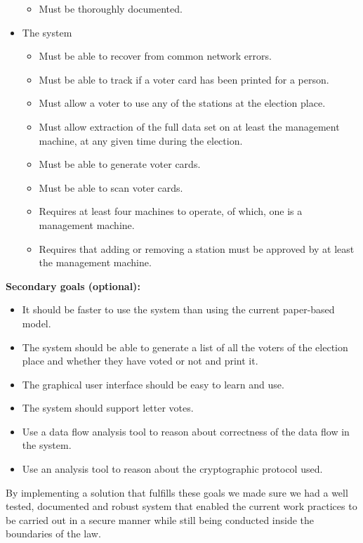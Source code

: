 \documentclass[a4paper]{report}
\begin{document}
\begin{itemize}
\begin{itemize}
\item Must be thoroughly documented.
\end{itemize}
\item The system
\begin{itemize}
\item Must be able to recover from common network errors.
\item Must be able to track if a voter card has been printed for a person.
\item Must allow a voter to use any of the stations at the election place.
\item Must allow extraction of the full data set on at least the management machine, at any given time during the election.
\item Must be able to generate voter cards.
\item Must be able to scan voter cards.
\item Requires at least four machines to operate, of which, one is a management machine.
\item Requires that adding or removing a station must be approved by at least the management machine.
\end{itemize}
\end{itemize}

\noindent \bf Secondary goals (optional): \rm
\begin{itemize}
\item It should be faster to use the system than using the current paper-based model.
\item The system should be able to generate a list of all the voters of the election place and whether they have voted or not and print it.
\item The graphical user interface should be easy to learn and use.
\item The system should support letter votes.
\item Use a data flow analysis tool to reason about correctness of the data flow in the system.
\item Use an analysis tool to reason about the cryptographic protocol used.	
\end{itemize}

\noindent By implementing a solution that fulfills these goals we made sure we had a well tested, documented and robust system that enabled the current work practices to be carried out in a secure manner while still being conducted inside the boundaries of the law. \\
\end{document}
